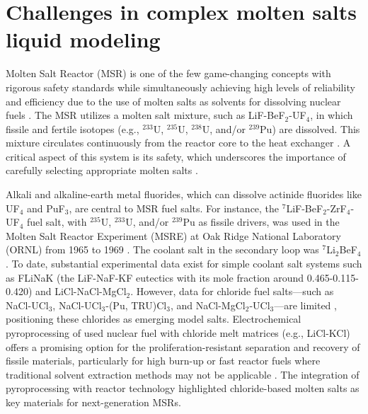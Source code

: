 \section{Challenges in complex molten salts liquid modeling } \label{intro:sec:moltensalts}
Molten Salt Reactor (MSR) is one of the few game-changing concepts with rigorous safety standards while simultaneously achieving high levels of reliability and efficiency due to the use of molten salts as solvents for dissolving nuclear fuels \cite{blander1964molten, abram2008generation, cottrell1955operation}. The MSR utilizes a molten salt mixture, such as LiF-BeF$_2$-UF$_4$, in which fissile and fertile isotopes (e.g., $^{233}$U, $^{235}$U, $^{238}$U, and/or $^{239}$Pu) are dissolved. This mixture circulates continuously from the reactor core to the heat exchanger \cite{blander1964molten, leblanc2010molten}. A critical aspect of this system is its safety, which underscores the importance of carefully selecting appropriate molten salts \cite{benevs2013thermodynamic}.

Alkali and alkaline-earth metal fluorides, which can dissolve actinide fluorides like UF$_4$ and PuF$_3$, are central to MSR fuel salts. For instance, the $^7$LiF-BeF$_2$-ZrF$_4$-UF$_4$ fuel salt, with $^{235}$U, $^{233}$U, and/or $^{239}$Pu as fissile drivers, was used in the Molten Salt Reactor Experiment (MSRE) at Oak Ridge National Laboratory (ORNL) from 1965 to 1969 \cite{blander1964molten}. The coolant salt in the secondary loop was $^7$Li$_2$BeF$_4$. To date, substantial experimental data exist for simple coolant salt systems such as FLiNaK (the LiF-NaF-KF eutectics with its mole fraction around 0.465-0.115-0.420) and LiCl-NaCl-MgCl$_2$. However, data for chloride fuel salts—such as NaCl-UCl$_3$, NaCl-UCl$_3$-(Pu, TRU)Cl$_3$, and NaCl-MgCl$_2$-UCl$_3$—are limited \cite{mourogov2006potentialities}, positioning these chlorides as emerging model salts. Electrochemical pyroprocessing of used nuclear fuel with chloride melt matrices (e.g., LiCl-KCl) offers a promising option for the proliferation-resistant separation and recovery of fissile materials, particularly for high burn-up or fast reactor fuels where traditional solvent extraction methods may not be applicable \cite{blander1964molten}. The integration of pyroprocessing with reactor technology highlighted chloride-based molten salts as key materials for next-generation MSRs.

